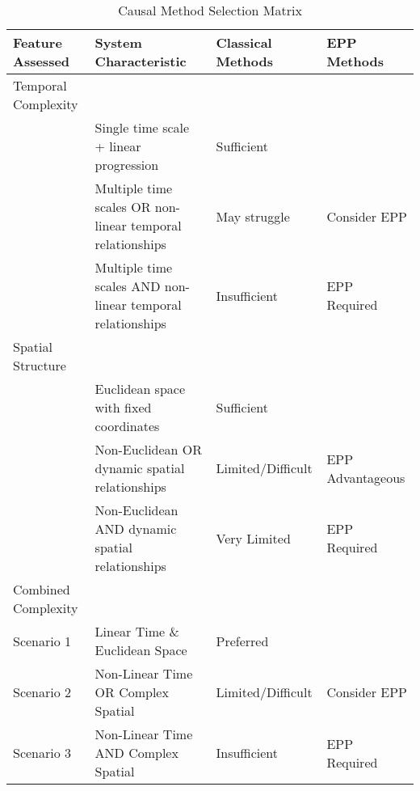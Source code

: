 \documentclass{article}
\begin{document}
\begin{table}[hb]
\begin{tabular}{llll}
Feature Assessed &
  System Characteristic &
  Classical Methods &
  EPP Methods \\ \hline
\multicolumn{1}{|l|}{Temporal Complexity} &
  \multicolumn{1}{l|}{} &
  \multicolumn{1}{l|}{} &
  \multicolumn{1}{l|}{} \\ \hline
\multicolumn{1}{|l|}{} &
  \multicolumn{1}{l|}{Single time scale + linear progression} &
  \multicolumn{1}{l|}{Sufficient} &
  \multicolumn{1}{l|}{} \\ \hline
\multicolumn{1}{|l|}{} &
  \multicolumn{1}{l|}{Multiple time scales OR non-linear temporal relationships} &
  \multicolumn{1}{l|}{May struggle} &
  \multicolumn{1}{l|}{Consider EPP} \\ \hline
\multicolumn{1}{|l|}{} &
  \multicolumn{1}{l|}{Multiple time scales AND non-linear temporal relationships} &
  \multicolumn{1}{l|}{Insufficient} &
  \multicolumn{1}{l|}{EPP Required} \\ \hline
\multicolumn{1}{|l|}{Spatial Structure} &
  \multicolumn{1}{l|}{} &
  \multicolumn{1}{l|}{} &
  \multicolumn{1}{l|}{} \\ \hline
\multicolumn{1}{|l|}{} &
  \multicolumn{1}{l|}{Euclidean space with fixed coordinates} &
  \multicolumn{1}{l|}{Sufficient} &
  \multicolumn{1}{l|}{} \\ \hline
\multicolumn{1}{|l|}{} &
  \multicolumn{1}{l|}{Non-Euclidean OR dynamic spatial relationships} &
  \multicolumn{1}{l|}{Limited/Difficult} &
  \multicolumn{1}{l|}{EPP Advantageous} \\ \hline
\multicolumn{1}{|l|}{} &
  \multicolumn{1}{l|}{Non-Euclidean AND dynamic spatial relationships} &
  \multicolumn{1}{l|}{Very Limited} &
  \multicolumn{1}{l|}{EPP Required} \\ \hline
\multicolumn{1}{|l|}{Combined Complexity} &
  \multicolumn{1}{l|}{} &
  \multicolumn{1}{l|}{} &
  \multicolumn{1}{l|}{} \\ \hline
\multicolumn{1}{|l|}{Scenario 1} &
  \multicolumn{1}{l|}{Linear Time \& Euclidean Space} &
  \multicolumn{1}{l|}{Preferred} &
  \multicolumn{1}{l|}{} \\ \hline
\multicolumn{1}{|l|}{Scenario 2} &
  \multicolumn{1}{l|}{Non-Linear Time OR Complex Spatial} &
  \multicolumn{1}{l|}{Limited/Difficult} &
  \multicolumn{1}{l|}{Consider EPP} \\ \hline
\multicolumn{1}{|l|}{Scenario 3} &
  \multicolumn{1}{l|}{Non-Linear Time AND Complex Spatial} &
  \multicolumn{1}{l|}{Insufficient} &
  \multicolumn{1}{l|}{EPP Required} \\ \hline
\end{tabular}
\caption{Causal Method Selection Matrix}
\label{tab:method_matrix}
\end{table}
\end{document}
